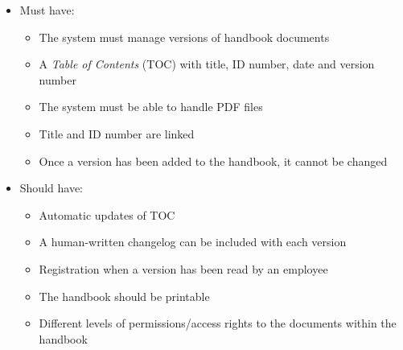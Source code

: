 \begin{itemize}
    \item
    Must have:
        \begin{itemize}
            \item
            The system must manage versions of handbook documents
            \item
            A \textit{Table of Contents} (TOC) with title, ID number, date and version number
            \item
            The system must be able to handle PDF files
            \item
            Title and ID number are linked
            \item
            Once a version has been added to the handbook, it cannot be changed
        \end{itemize}
    \item
    Should have:
        \begin{itemize}
			\item
			Automatic updates of TOC
            \item
            A human-written changelog can be included with each version
            \item
            Registration when a version has been read by an employee
            \item
            The handbook should be printable
            \item
            Different levels of permissions/access rights to the documents within the handbook

\end{itemize}
\end{itemize}
